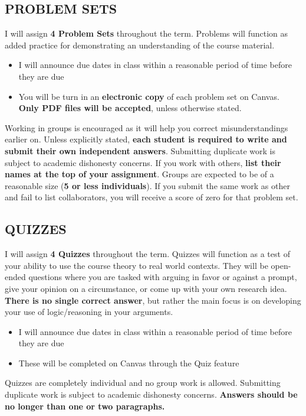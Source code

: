 \documentclass[11pt]{article}
\begin{document}


\subsection*{PROBLEM SETS}
I will assign \textbf{4 Problem Sets} throughout the term. 
Problems will function as added practice for demonstrating an understanding of the course material. 

\begin{itemize}
    \item I will announce due dates in class within a reasonable period of time before they are due
    \item You will be turn in an \textbf{electronic copy} of each problem set on Canvas. 
    \textbf{Only PDF files will be accepted}, unless otherwise stated. 
\end{itemize}
Working in groups is encouraged as it will help you correct misunderstandings earlier on. 
Unless explicitly stated, \textbf{each student is required to write and submit their own independent answers}. 
Submitting duplicate work is subject to academic dishonesty concerns. 
If you work with others, \textbf{list their names at the top of your assignment}. 
Groups are expected to be of a reasonable size (\textbf{5 or less individuals}). 
If you submit the same work as other and fail to list collaborators, you will receive a score of zero for that problem set. 

\subsection*{QUIZZES}
I will assign \textbf{4 Quizzes} throughout the term. 
Quizzes will function as a test of your ability to use the course theory to real world contexts. 
They will be open-ended questions where you are tasked with arguing in favor or against a prompt, give your opinion on a circumstance, or come up with your own research idea. 
\textbf{There is no single correct answer}, but rather the main focus is on developing your use of logic/reasoning in your arguments. 

\begin{itemize}
    \item I will announce due dates in class within a reasonable period of time before they are due
    \item These will be completed on Canvas through the Quiz feature
\end{itemize}
Quizzes are completely individual and no group work is allowed. 
Submitting duplicate work is subject to academic dishonesty concerns. 
\textbf{Answers should be no longer than one or two paragraphs.} 
\end{document}
